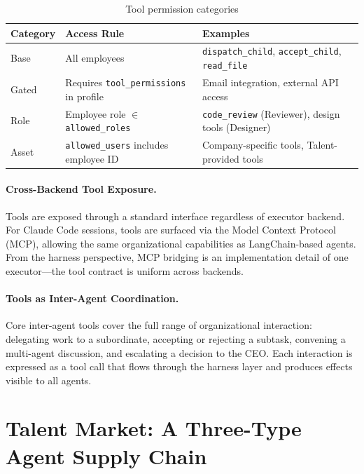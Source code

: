 \begin{table}[H]
\centering
\caption{Tool permission categories}
\label{tab:tools}
\small
\setlength{\tabcolsep}{4pt}
\begin{tabularx}{\textwidth}{@{}>{\raggedright\arraybackslash}p{}>{\raggedright\arraybackslash}p{}X@{}}
\toprule
\textbf{Category} & \textbf{Access Rule} & \textbf{Examples} \\
\midrule
Base & All employees & \texttt{dispatch\_child}, \texttt{accept\_child}, \texttt{read\_file} \\
Gated & Requires \texttt{tool\_permissions} in profile & Email integration, external API access \\
Role & Employee role $\in$ \texttt{allowed\_roles} & \texttt{code\_review} (Reviewer), design tools (Designer) \\
Asset & \texttt{allowed\_users} includes employee ID & Company-specific tools, Talent-provided tools \\
\bottomrule
\end{tabularx}
\end{table}

\paragraph{Cross-Backend Tool Exposure.}
Tools are exposed through a standard interface regardless of executor backend. For Claude Code sessions, tools are surfaced via the Model Context Protocol (MCP), allowing the same organizational capabilities as LangChain-based agents. From the harness perspective, MCP bridging is an implementation detail of one executor---the tool contract is uniform across backends.

\paragraph{Tools as Inter-Agent Coordination.}
Core inter-agent tools cover the full range of organizational interaction: delegating work to a subordinate, accepting or rejecting a subtask, convening a multi-agent discussion, and escalating a decision to the CEO. Each interaction is expressed as a tool call that flows through the harness layer and produces effects visible to all agents.

\section{Talent Market: A Three-Type Agent Supply Chain}
\label{sec:talent-supply}


